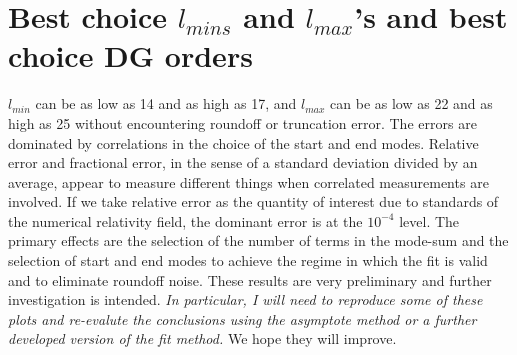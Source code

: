 \section{Best choice $l_{mins}$ and $l_{max}$'s and best choice DG orders}

$l_{min}$ can be as low as 14 and as high as 17, and $l_{max}$ can be as low as 22 and as high as 25 without encountering roundoff or truncation error. The errors are dominated by correlations in the choice of the start and end modes. Relative error and fractional error, in the sense of a standard deviation divided by an average, appear to measure different things when correlated measurements are involved. If we take relative error as the quantity of interest due to standards of the numerical relativity field, the dominant error is at the $10^{-4}$ level. The primary effects are the selection of the number of terms in the mode-sum and the selection of start and end modes to achieve the regime in which the fit is valid and to eliminate roundoff noise. These results are very preliminary and further investigation is intended. {\em In particular, I will need to reproduce some of these plots and re-evalute the conclusions using the asymptote method or a further developed version of the fit method.} We hope they will improve.

